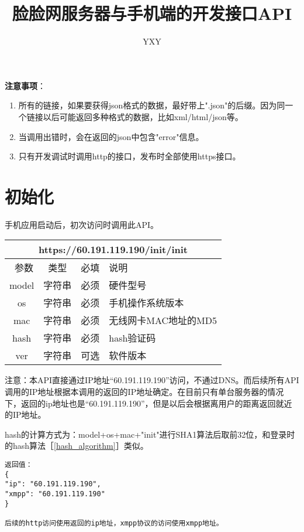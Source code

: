 \documentclass[cs4size]{ctexartutf8}
\author{YXY}
\title{脸脸网服务器与手机端的开发接口API}
\begin{document}
 
\maketitle
\tableofcontents

\newpage

\textbf{注意事项}：
\begin{enumerate}
\item 所有的链接，如果要获得json格式的数据，最好带上".json"的后缀。因为同一个链接以后可能返回多种格式的数据，比如xml/html/json等。
\item 当调用出错时，会在返回的json中包含"error"信息。
\item 只有开发调试时调用http的接口，发布时全部使用https接口。
\end{enumerate}

\newpage

\section{初始化}
手机应用启动后，初次访问时调用此API。
\begin{table}[H]
   \begin{center}
\begin{tabular}{|c|c|c|p{12cm}|}
\hline
\multicolumn{4}{|c|}{https://60.191.119.190/init/init} \\
\hline\hline
 \  参数  & 类型 & 必填 &  说明  \\
 \hline
 model  & 字符串 & 必须 &  硬件型号\\
\hline
 os  & 字符串 & 必须 &  手机操作系统版本\\
 \hline
 mac  & 字符串 & 必须 &  无线网卡MAC地址的MD5\\
 \hline
 hash  & 字符串 & 必须 &  hash验证码\\
  \hline
 ver  & 字符串 & 可选 &  软件版本\\
\hline
\end{tabular}
   \end{center}
\end{table}

注意：本API直接通过IP地址“60.191.119.190”访问，不通过DNS。而后续所有API调用的IP地址根据本调用的返回的IP地址确定。在目前只有单台服务器的情况下，返回的ip地址也是“60.191.119.190”，但是以后会根据离用户的距离返回就近的IP地址。


hash的计算方式为：model+os+mac+"init"进行SHA1算法后取前32位，和登录时的hash算法［\ref{hash_algorithm}］类似。

\begin{verbatim}
返回值：
{
"ip": "60.191.119.190",
"xmpp": "60.191.119.190"
}

后续的http访问使用返回的ip地址，xmpp协议的访问使用xmpp地址。

\end{verbatim}
\end{document}
